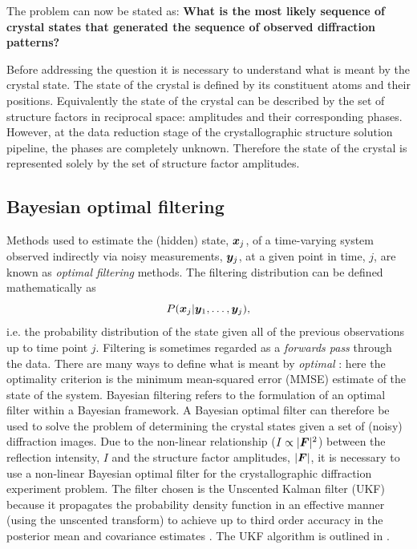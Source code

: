 The problem can now be stated as:
\textbf{What is the most likely sequence of crystal states that generated the sequence of observed diffraction patterns?}

Before addressing the question it is necessary to understand what is meant by the crystal state.
The state of the crystal is defined by its constituent atoms and their positions.
Equivalently the state of the crystal can be described by the set of structure factors in reciprocal space: amplitudes and their corresponding phases.
However, at the data reduction stage of the crystallographic structure solution pipeline, the phases are completely unknown.
Therefore the state of the crystal is represented solely by the set of structure factor amplitudes.

\subsection{Bayesian optimal filtering}
\label{sub:Bayesian optimal filtering}
Methods used to estimate the (hidden) state, $\boldsymbol{x}_j$, of a time-varying system observed indirectly via noisy measurements, $\boldsymbol{y}_j$, at a given point in time, $j$,  are known as \textit{optimal filtering} methods.
The filtering distribution can be defined mathematically as
\begin{equation}
    P(\boldsymbol{x}_j | \boldsymbol{y}_1, \ldots, \boldsymbol{y}_j),
    \label{eq:Filtering Distribution}
\end{equation}
i.e. the probability distribution of the state given all of the previous observations up to time point $j$.
Filtering is sometimes regarded as a \textit{forwards pass} through the data.
There are many ways to define what is meant by \textit{optimal} \cite{chen2003bayesian}: here the optimality criterion is the minimum mean-squared error (MMSE) estimate of the state of the system.
Bayesian filtering refers to the formulation of an optimal filter within a Bayesian framework.
A Bayesian optimal filter can therefore be used to solve the problem of determining the crystal states given a set of (noisy) diffraction images.
Due to the non-linear relationship ($I \propto |\boldsymbol{F}|^2$) between the reflection intensity, $I$ and the structure factor amplitudes, $|\boldsymbol{F}|$, it is necessary to use a non-linear Bayesian optimal filter for the crystallographic diffraction experiment problem.
The filter chosen is the Unscented Kalman filter (UKF) because it propagates the probability density function in an effective manner (using the unscented transform) to achieve up to third order accuracy in the posterior mean and covariance estimates \cite{wan2000unscented}.
The UKF algorithm is outlined in \cite{wan2002Unscented}.

